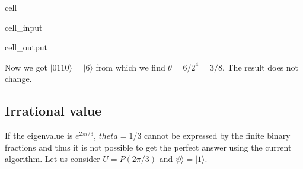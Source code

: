 \documentclass[letterpaper,10pt,english]{jupyterBook}
\begin{document}
\begin{sphinxuseclass}{cell}
\begin{sphinxVerbatimInput}
\begin{sphinxuseclass}{cell_input}
\begin{sphinxVerbatim}[commandchars=\\\{\}]
  

  

  

   
\end{sphinxVerbatim}

\end{sphinxuseclass}\end{sphinxVerbatimInput}
\begin{sphinxVerbatimOutput}

\begin{sphinxuseclass}{cell_output}
\noindent{}

\end{sphinxuseclass}\end{sphinxVerbatimOutput}

\end{sphinxuseclass}
\sphinxAtStartPar
Now we got \(|0110\rangle = |6\rangle\) from which we find \(\theta = 6/2^4 = 3/8\).  The result does not change.


\subsection{Irrational value}
\label{\detokenize{algorithms/qpe:irrational-value}}
\sphinxAtStartPar
If the eigenvalue is \(e^{2\pi i /3}\), \(theta=1/3\) cannot be expressed by the finite binary fractions and thus it is not possible to get the perfect answer using the current algorithm.  Let us consider \(U=P(2\pi/3)\) and \(\psi\rangle=|1\rangle\).
\end{document}

